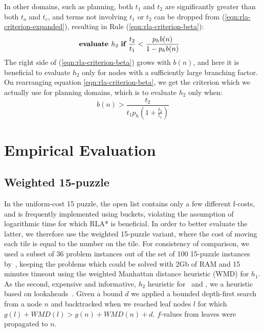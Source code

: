 In other domains, such as planning, both $t_1$ and $t_2$ are
significantly greater than both $t_o$ and $t_c$, and terms
not involving $t_1$ or $t_2$ can be dropped from
(\ref{eqn:rla-criterion-expanded}), resulting in Rule (\ref{eqn:rla-criterion-beta}):
\begin{align}
  &\mbox{\bf evaluate }h_2\mbox{ \bf if } \frac{t_2}{t_1} < \frac {p_hb(n)} {1-p_hb(n)}
\label{eqn:rla-criterion-beta}
\end{align}
The right side of (\ref{eqn:rla-criterion-beta}) grows with $b(n)$, and here it is beneficial to evaluate $h_2$
only for nodes with a sufficiently large branching factor. On rearranging equation \ref{eqn:rla-criterion-beta},
we get the criterion which we actually use for planning domains,
which is to evaluate $h_2$ only when:
\begin{equation}
b(n) > \frac{t_2}{t_1 p_h \left(1 + \frac{t_2}{t_1}\right)}
\label{eqn:rla-planning-rule}
\end{equation}

\section{Empirical Evaluation}
\label{sec:rla-empirical}

\subsection{Weighted 15-puzzle}

In the uniform-cost 15 puzzle, the open list contains only a few
different f-costs, and is frequently implemented using buckets,
violating the assumption of logarithmic time for which RLA* is
beneficial. In order to better evaluate the latter, we therefore use
the weighted 15-puzzle variant, where the cost of moving each tile is
equal to the number on the tile.  For consistency of comparison, we
used a subset of 36 problem instances out of the set of 100 15-puzzle
instances by~\cite{BFID85}, keeping the problems which could be solved
with 2Gb of RAM and 15 minutes timeout using the weighted Manhattan
distance heuristic (WMD) for $h_1$. As the second, expensive and informative,
$h_2$ heuristic for \lazyastar~and \rationallazyastar, we a heuristic
based on lookaheads~\cite{DBLP:conf/aaai/SternKFH10}. Given a bound
$d$ we applied a bounded depth-first search from a node $n$ and
backtracked when we reached leaf nodes $l$ for which $g(l)+WMD(l)>
g(n)+WMD(n)+d$. $f$-values from leaves were propagated to $n$.

